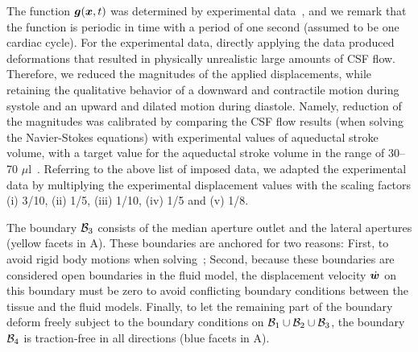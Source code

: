 \documentclass{template}
\begin{document}
The function $\bm{g}(\bm{x}, t)$ was determined by experimental
data~\citep{Kurtcuoglu2007ComputationalSylvius,
Enzmann1992BrainImaging, soellinger20093d, soellinger2007assessment,
greitz1992pulsatile, almudayni2023magnetic, pahlavian2018regional},
and we remark that the function is periodic in time with a period of
one second (assumed to be one cardiac cycle).
For the experimental data, directly applying the data produced
deformations that resulted in physically unrealistic large amounts of CSF flow.
Therefore, we reduced the magnitudes of the applied displacements,
while retaining the qualitative behavior
of a downward and contractile motion during systole and an upward
and dilated motion during diastole. Namely, reduction of the magnitudes was 
calibrated by comparing the CSF flow results (when solving the Navier-Stokes equations) with experimental values
of aqueductal stroke volume, with a target value for the aqueductal stroke
volume in the range of 30--70 $\mu$l~\citep{eide2021direction, wagshul2011pulsating}. 
Referring to the above list of imposed data, we adapted the experimental data by multiplying
the experimental displacement values with the scaling factors (i) 3/10, (ii) 1/5, (iii) 1/10, (iv) 1/5 and (v) 1/8.

The boundary $\mathcal{B}_3$ consists of the median aperture outlet
and the lateral apertures (yellow facets in A).
These boundaries are anchored for two reasons:
First, to avoid rigid body motions when solving~;
Second, because these boundaries are
considered open boundaries in the fluid model, the displacement velocity
$\dot{\bm{w}}$ on this boundary must be zero to avoid conflicting boundary conditions
between the tissue and the fluid models.
Finally, to let the remaining part of the boundary deform freely subject to the boundary conditions
on $\mathcal{B}_1\cup\mathcal{B}_2\cup\mathcal{B}_3$, the boundary $\mathcal{B}_4$ is traction-free in all directions
(blue facets in A).
\end{document}
